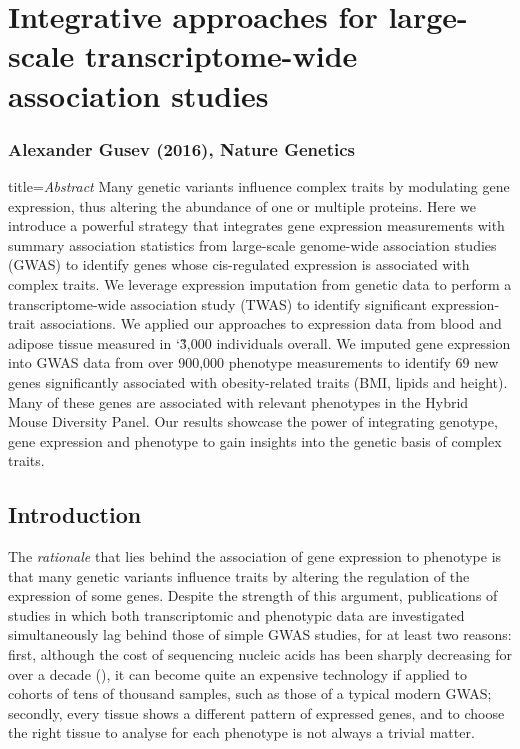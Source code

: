 \documentclass[../main.tex]{subfiles}
\begin{document}
\chapter{Integrative approaches for large-scale transcriptome-wide 
association studies}

\subsection{Alexander Gusev \etal (2016), Nature Genetics}

\begin{external_abstract}{title=\textit{Abstract}}
Many genetic variants influence complex traits by modulating gene 
expression, thus altering the abundance of one or multiple proteins. 
Here we introduce a powerful strategy that integrates gene expression 
measurements with summary association statistics from large-scale 
genome-wide association studies (GWAS) to identify genes whose 
cis-regulated expression is associated with complex traits. We leverage 
expression imputation from genetic data to perform a transcriptome-wide 
association study (TWAS) to identify significant expression-trait 
associations. We applied our approaches to expression data from blood 
and adipose tissue measured in \char`\~3,000 individuals overall. We 
imputed gene expression into GWAS data from over 900,000 phenotype 
measurements to identify 69 new genes significantly associated with 
obesity-related traits (BMI, lipids and height). Many of these genes are 
associated with relevant phenotypes in the Hybrid Mouse Diversity Panel. 
Our results showcase the power of integrating genotype, gene expression 
and phenotype to gain insights into the genetic basis of complex traits.
\end{external_abstract}

\section{Introduction}

The \textit{rationale} that lies behind the association of gene 
expression to phenotype is that many genetic variants influence traits 
by altering the regulation of the expression of some genes. Despite the 
strength of this argument, publications of studies in which both 
transcriptomic and phenotypic data are investigated simultaneously lag 
behind those of simple GWAS studies, for at least two reasons: first, 
although the cost of sequencing nucleic acids has been sharply 
decreasing for over a decade (), it can become 
quite an expensive technology if applied to cohorts of tens of thousand 
samples, such as those of a typical modern GWAS; secondly, every tissue 
shows a different pattern of expressed genes, and to choose the right 
tissue to analyse for each phenotype is not always a trivial matter.
\end{document}
